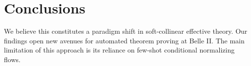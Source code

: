 \section{Conclusions}\label{sec:conclusions}

We believe this constitutes a paradigm shift in soft-collinear effective
theory. Our findings open new avenues for automated theorem proving at
Belle II. The main limitation of this approach is its reliance on
few-shot conditional normalizing flows.

